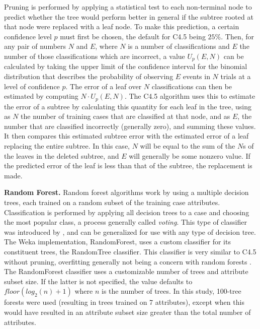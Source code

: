 \documentclass[main.tex]{subfiles}
\begin{document}
Pruning is performed by applying a statistical test to each non-terminal node to predict whether the tree would perform better in general if the subtree rooted at that node were replaced with a leaf node. To make this prediction, a certain confidence level $p$ must first be chosen, the default for C4.5 being $25\%$. Then, for any pair of numbers $N$ and $E$, where $N$ is a number of classifications and $E$ the number of those classifications which are incorrect, a value $U_{p}(E,N)$ can be calculated by taking the upper limit of the confidence interval for the binomial distribution that describes the probability of observing $E$ events in $N$ trials at a level of confidence $p$. The error of a leaf over $N$ classifications can then be estimated by computing $N\cdot U_{p}(E,N)$. The C4.5 algorithm uses this to estimate the error of a subtree by calculating this quantity for each leaf in the tree, using as $N$ the number of training cases that are classified at that node, and as $E$, the number that are classified incorrectly (generally zero), and summing these values. It then compares this estimated subtree error with the estimated error of a leaf replacing the entire subtree. In this case, $N$ will be equal to the sum of the $N$s of the leaves in the deleted subtree, and $E$ will generally be some nonzero value. If the predicted error of the leaf is less than that of the subtree, the replacement is made.

\textbf{Random Forest.} Random forest algorithms work by using a multiple decision trees, each trained on a random subset of the training case attributes. Classification is performed by applying all decision trees to a case and choosing the most popular class, a process generally called \textit{voting}. This type of classifier was introduced by \citet{breiman:2001}, and can be generalized for use with any type of decision tree. The Weka implementation, RandomForest, uses a custom classifier for its constituent trees, the RandomTree classifier. This classifier is very similar to C4.5 without pruning, overfitting generally not being a concern with random forests \citep{breiman:2001}. The RandomForest classifier uses a customizable number of trees and attribute subset size. If the latter is not specified, the value defaults to $floor(log_2(n)+1)$ where $n$ is the number of trees. In this study, 100-tree forests were used (resulting in trees trained on 7 attributes), except when this would have resulted in an attribute subset size greater than the total number of attributes.


\biblio
\end{document}
